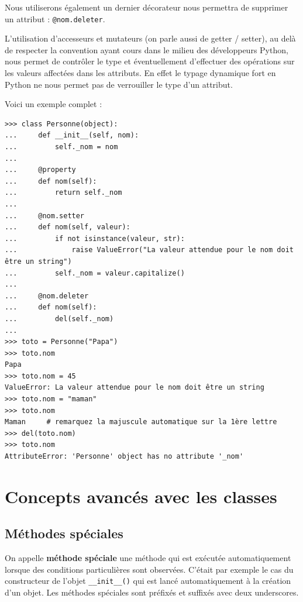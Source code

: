 \documentclass[12pt, a4paper]{article}
\begin{document}
Nous utiliserons également un dernier décorateur nous permettra de supprimer un attribut : \lstinline{@nom.deleter}.

L'utilisation d'accesseurs et mutateurs (on parle aussi de getter / setter), au delà de respecter la convention ayant cours dans le milieu des développeurs Python, nous permet de contrôler le type et éventuellement d'effectuer des opérations sur les valeurs affectées dans les attributs. En effet le typage dynamique fort en Python ne nous permet pas de verrouiller le type d'un attribut.

Voici un exemple complet :
\begin{lstlisting}
>>> class Personne(object):
...     def __init__(self, nom):
...         self._nom = nom
...
...     @property
...     def nom(self):
...         return self._nom
...
...     @nom.setter
...     def nom(self, valeur):
...         if not isinstance(valeur, str):
...             raise ValueError("La valeur attendue pour le nom doit être un string")
...         self._nom = valeur.capitalize()
...
...     @nom.deleter
...     def nom(self):
...         del(self._nom)
...
>>> toto = Personne("Papa")
>>> toto.nom
Papa
>>> toto.nom = 45
ValueError: La valeur attendue pour le nom doit être un string
>>> toto.nom = "maman"
>>> toto.nom		 
Maman     # remarquez la majuscule automatique sur la 1ère lettre
>>> del(toto.nom)
>>> toto.nom
AttributeError: 'Personne' object has no attribute '_nom'
\end{lstlisting}



\section{Concepts avancés avec les classes}
\label{sec:classes_avancees}

\subsection{Méthodes spéciales}
On appelle \textbf{méthode spéciale} une méthode qui est exécutée automatiquement lorsque des conditions particulières sont observées. C'était par exemple le cas du constructeur de l'objet \lstinline{__init__()} qui est lancé automatiquement à la création d'un objet. Les méthodes spéciales sont préfixés et suffixés avec deux underscores.
\end{document}
